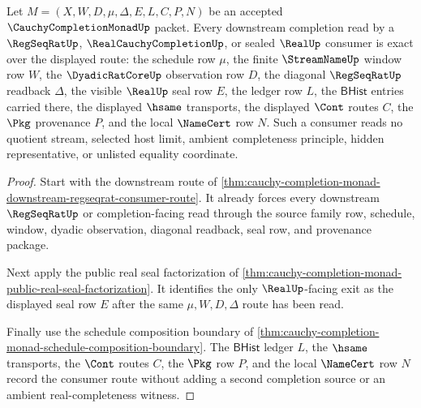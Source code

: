 \begin{theorem}
\label{thm:cauchy-completion-monad-downstream-completion-consumer-exactness}
Let $M=(X,W,D,\mu,\Delta,E,L,C,P,N)$ be an accepted $\CauchyCompletionMonadUp$ packet. Every downstream completion read by a $\RegSeqRatUp$, $\RealCauchyCompletionUp$, or sealed $\RealUp$ consumer is exact over the displayed route: the schedule row $\mu$, the finite $\StreamNameUp$ window row $W$, the $\DyadicRatCoreUp$ observation row $D$, the diagonal $\RegSeqRatUp$ readback $\Delta$, the visible $\RealUp$ seal row $E$, the ledger row $L$, the $\mathsf{BHist}$ entries carried there, the displayed $\hsame$ transports, the displayed $\Cont$ routes $C$, the $\Pkg$ provenance $P$, and the local $\NameCert$ row $N$. Such a consumer reads no quotient stream, selected host limit, ambient completeness principle, hidden representative, or unlisted equality coordinate.
\end{theorem}
\begin{proof}
Start with the downstream route of \autoref{thm:cauchy-completion-monad-downstream-regseqrat-consumer-route}. It already forces every downstream $\RegSeqRatUp$ or completion-facing read through the source family row, schedule, window, dyadic observation, diagonal readback, seal row, and provenance package.

Next apply the public real seal factorization of \autoref{thm:cauchy-completion-monad-public-real-seal-factorization}. It identifies the only $\RealUp$-facing exit as the displayed seal row $E$ after the same $\mu,W,D,\Delta$ route has been read.

Finally use the schedule composition boundary of \autoref{thm:cauchy-completion-monad-schedule-composition-boundary}. The $\mathsf{BHist}$ ledger $L$, the $\hsame$ transports, the $\Cont$ routes $C$, the $\Pkg$ row $P$, and the local $\NameCert$ row $N$ record the consumer route without adding a second completion source or an ambient real-completeness witness.
\end{proof}

